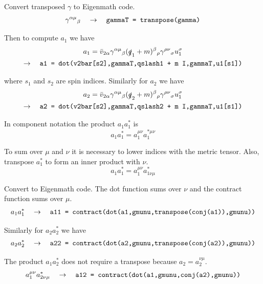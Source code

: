 \documentclass[12pt]{article}
\begin{document}
\noindent
Convert transposed $\gamma$ to Eigenmath code.
\begin{equation*}
\gamma^{\alpha\mu}{}_\beta
\quad\rightarrow\quad
\text{\tt gammaT = transpose(gamma)}
\end{equation*}

\noindent
Then to compute $a_1$ we have
\begin{multline*}
a_1=\bar{v}_{2\alpha}\gamma^{\alpha\mu}{}_\beta(\slashed{q}_1+m)^\beta{}_\rho\gamma^{\rho\nu}{}_\sigma u_1^\sigma
\\
\rightarrow\quad
\text{\tt a1 = dot(v2bar[s2],gammaT,qslash1 + m I,gammaT,u1[s1])}
\end{multline*}

\noindent
where $s_1$ and $s_2$ are spin indices.
Similarly for $a_2$ we have
\begin{multline*}
a_2=\bar{v}_{2\alpha}\gamma^{\alpha\mu}{}_\beta(\slashed{q}_2+m)^\beta{}_\rho\gamma^{\rho\nu}{}_\sigma u_1^\sigma
\\
\rightarrow\quad
\text{\tt a2 = dot(v2bar[s2],gammaT,qslash2 + m I,gammaT,u1[s1])}
\end{multline*}

\noindent
In component notation the product $a_1a_1^*$ is
\begin{equation*}
a_1a_1^*=a_1^{\mu\nu}a_1^{*\mu\nu}
\end{equation*}

\noindent
To sum over $\mu$ and $\nu$ it is necessary to lower indices with the metric tensor.
Also, transpose $a_1^*$ to form an inner product with $\nu$.
\begin{equation*}
a_1a_1^*=a_1^{\mu\nu}a_{1\nu\mu}^*
\end{equation*}

\noindent
Convert to Eigenmath code.
The dot function sums over $\nu$ and the contract function sums over $\mu$.
\begin{equation*}
a_1a_1^*
\quad\rightarrow\quad
\text{\tt a11 = contract(dot(a1,gmunu,transpose(conj(a1)),gmunu))}
\end{equation*}

\noindent
Similarly for $a_2a_2^*$ we have
\begin{equation*}
a_2a_2^*
\quad\rightarrow\quad
\text{\tt a22 = contract(dot(a2,gmunu,transpose(conj(a2)),gmunu))}
\end{equation*}

\noindent
The product $a_1a_2^*$ does not require a transpose because $a_2=a_2^{\nu\mu}$.
\begin{equation*}
a_1^{\mu\nu}a_{2\nu\mu}^*
\quad\rightarrow\quad
\text{\tt a12 = contract(dot(a1,gmunu,conj(a2),gmunu))}
\end{equation*}
\end{document}
